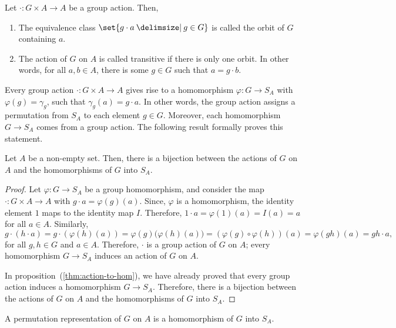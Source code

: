 \documentclass[11pt]{penrose}
\begin{document}
\begin{ndfn}
    Let $\cdot : G \times A \to A$ be a group action. Then,
    \begin{enumerate}
        \item The equivalence class $\set{g \cdot a \st g \in G}$ is called the orbit of $G$ containing $a$.
        \item The action of $G$ on $A$ is called transitive if there is only one orbit. In other words, for all $a, b \in A$, there is some $g \in G$ such that $a = g \cdot b$.
    \end{enumerate}
\end{ndfn}

Every group action $\cdot : G \times A \to A$ gives rise to a homomorphism $\varphi : G \to S_{A}$ with $\varphi(g) = \gamma_{g}$, such that $\gamma_{g}(a) = g \cdot a$. In other words, the group action assigns a permutation from $S_{A}$ to each element $g \in G$. Moreover, each homomorphism $G \to S_{A}$ comes from a group action. The following result formally proves this statement.

\begin{nprop}
    Let $A$ be a non-empty set. Then, there is a bijection between the actions of $G$ on $A$ and the homomorphisms of $G$ into $S_{A}$.
\end{nprop}
\begin{proof}
    Let $\varphi : G \to S_{A}$ be a group homomorphism, and consider the map $\cdot : G \times A \to A$ with $g \cdot a = \varphi(g)(a)$. Since, $\varphi$ is a homomorphism, the identity element $1$ maps to the identity map $I$. Therefore, $1 \cdot a = \varphi(1)(a) = I(a) = a$ for all $a \in A$. Similarly,
    \begin{equation*}
        g \cdot (h \cdot a)
        = g \cdot (\varphi(h)(a))
        = \varphi(g)\bigg( \varphi(h)(a) \bigg)
        = (\varphi(g) \circ \varphi(h))(a)
        = \varphi(gh)(a)
        = gh \cdot a,
    \end{equation*}
    for all $g, h \in G$ and $a \in A$. Therefore, $\cdot$ is a group action of $G$ on $A$; every homomorphism $G \to S_{A}$ induces an action of $G$ on $A$.

    In proposition~(\ref{thm:action-to-hom}), we have already proved that every group action induces a homomorphism $G \to S_{A}$. Therefore, there is a bijection between the actions of $G$ on $A$ and the homomorphisms of $G$ into $S_{A}$.
\end{proof}

\begin{ndfn}
    A permutation representation of $G$ on $A$ is a homomorphism of $G$ into $S_{A}$.
\end{ndfn}
\end{document}
